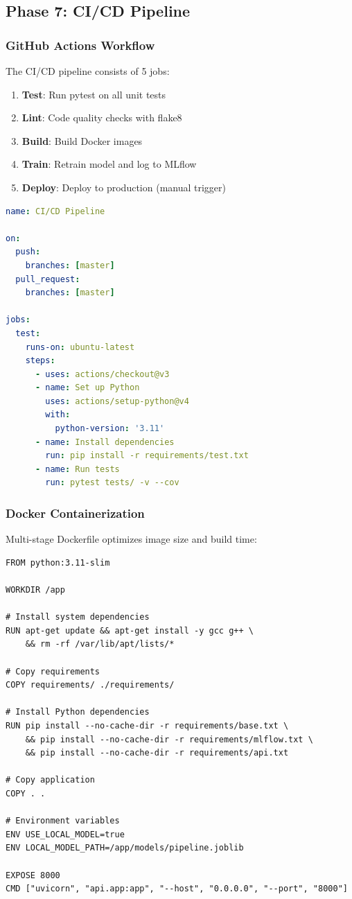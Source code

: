 \subsection{Phase 7: CI/CD Pipeline}

\subsubsection{GitHub Actions Workflow}

The CI/CD pipeline consists of 5 jobs:

\begin{enumerate}
    \item \textbf{Test}: Run pytest on all unit tests
    \item \textbf{Lint}: Code quality checks with flake8
    \item \textbf{Build}: Build Docker images
    \item \textbf{Train}: Retrain model and log to MLflow
    \item \textbf{Deploy}: Deploy to production (manual trigger)
\end{enumerate}

\begin{lstlisting}[language=yaml, caption=GitHub Actions Workflow]
name: CI/CD Pipeline

on:
  push:
    branches: [master]
  pull_request:
    branches: [master]

jobs:
  test:
    runs-on: ubuntu-latest
    steps:
      - uses: actions/checkout@v3
      - name: Set up Python
        uses: actions/setup-python@v4
        with:
          python-version: '3.11'
      - name: Install dependencies
        run: pip install -r requirements/test.txt
      - name: Run tests
        run: pytest tests/ -v --cov
\end{lstlisting}

\subsubsection{Docker Containerization}

Multi-stage Dockerfile optimizes image size and build time:

\begin{lstlisting}[language=docker, caption=Dockerfile]
FROM python:3.11-slim

WORKDIR /app

# Install system dependencies
RUN apt-get update && apt-get install -y gcc g++ \
    && rm -rf /var/lib/apt/lists/*

# Copy requirements
COPY requirements/ ./requirements/

# Install Python dependencies
RUN pip install --no-cache-dir -r requirements/base.txt \
    && pip install --no-cache-dir -r requirements/mlflow.txt \
    && pip install --no-cache-dir -r requirements/api.txt

# Copy application
COPY . .

# Environment variables
ENV USE_LOCAL_MODEL=true
ENV LOCAL_MODEL_PATH=/app/models/pipeline.joblib

EXPOSE 8000
CMD ["uvicorn", "api.app:app", "--host", "0.0.0.0", "--port", "8000"]
\end{lstlisting}


